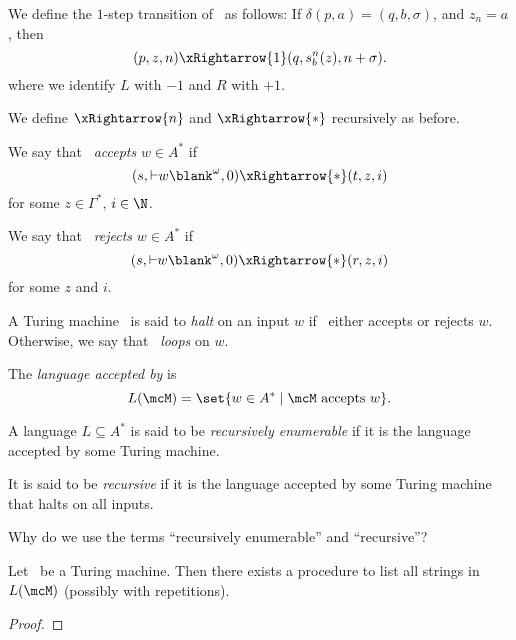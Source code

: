 \begin{definition}[Acceptance] \label{def:tm:acceptance}
    We define the $1$-step transition of \mcM\ as follows:
    If $\delta(p, a) = (q, b, \sigma)$, and $z_n = a$, then \[
        (p, z, n) \xRightarrow{1} (q, s_b^n(z), n+\sigma).
    \] where we identify $L$ with $-1$ and $R$ with $+1$.

    We define $\xRightarrow{n}$ and $\xRightarrow{*}$ recursively as
    before.

    We say that \mcM\ \emph{accepts} $w \in A^*$ if \[
        (s, \leftend w \blank^\omega, 0) \xRightarrow{*} (t, z, i)
    \] for some $z \in \Gamma^*$, $i \in \N$.

    We say that \mcM\ \emph{rejects} $w \in A^*$ if \[
        (s, \leftend w \blank^\omega, 0) \xRightarrow{*} (r, z, i)
    \] for some $z$ and $i$.
\end{definition}

\begin{definition}[Halting] \label{def:tm:halting}
    A Turing machine \mcM\ is said to \emph{halt} on an input $w$ if
    \mcM\ either accepts or rejects $w$.
    Otherwise, we say that \mcM\ \emph{loops} on $w$.

    The \emph{language accepted by \mcM} is \[
        L(\mcM) = \set{w \in A^* \mid \mcM \text{ accepts } w}.
    \]

    A language $L \subseteq A^*$ is said to be \emph{recursively enumerable}
    if it is the language accepted by some Turing machine.

    It is said to be \emph{recursive} if it is the language accepted by some
    Turing machine that halts on all inputs.
\end{definition}
Why do we use the terms ``recursively enumerable'' and ``recursive''?
\begin{proposition}
\label{thm:tm:recursively_enumerable}
    Let \mcM\ be a Turing machine.
    Then there exists a procedure to list all strings in $L(\mcM)$
    (possibly with repetitions).
\end{proposition}
\begin{proof}
    
\end{proof}
